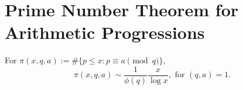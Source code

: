 \section{Prime Number Theorem for Arithmetic Progressions}
\begin{theorem}
    
For $\pi(x,q,a):=\#\{p\le x: p \equiv a \pmod q\}$, 
 \begin{equation*}
    \pi(x,q,a)\sim \frac{1}{\phi(q)}\frac{x}{\log x}, \text{ for }(q,a)=1.
\end{equation*}   
\end{theorem}


